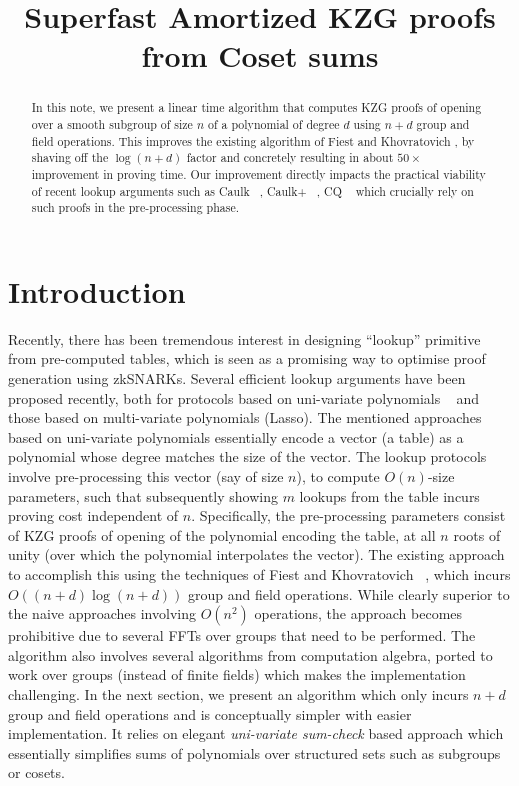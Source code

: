 \documentclass[11pt]{article}
\title{Superfast Amortized KZG proofs from Coset sums}
\begin{document}
    \maketitle
    \begin{abstract}
    In this note, we present a linear time algorithm that computes KZG proofs of opening over
        a smooth subgroup of size $n$ of a polynomial of degree $d$ using $n+d$ group and
        field operations. This improves the existing algorithm of Fiest and Khovratovich
        \cite{EPRINT:FeiKho23}, by shaving off the $\log(n+d)$ factor and concretely resulting
        in about $50\times$ improvement in proving time. Our improvement directly impacts the
        practical viability of recent lookup arguments such as Caulk ~\cite{CCS:ZBKMNS22},
        Caulk+ ~\cite{EPRINT:PosKat22}, CQ ~\cite{EPRINT:EagFioGab22} which crucially
        rely on such proofs in the pre-processing phase.
    \end{abstract}

    \section{Introduction}\label{sec:introduction}
    Recently, there has been tremendous interest in designing ``lookup'' primitive from pre-computed tables,
    which is seen as a promising way to optimise proof generation using zkSNARKs. Several efficient lookup
    arguments have been proposed recently, both for protocols based on uni-variate polynomials ~\cite{CCS:ZBKMNS22,
    EPRINT:PosKat22, EPRINT:EagFioGab22,EPRINT:ZGKMR22} and those based on multi-variate polynomials (Lasso).
    The mentioned approaches based on uni-variate polynomials essentially encode a vector (a table) as a
    polynomial whose degree matches the size of the vector. The lookup protocols involve pre-processing this
    vector (say of size $n$), to compute $O(n)$-size parameters, such that subsequently showing $m$ lookups
    from the table incurs proving cost independent of $n$. Specifically, the pre-processing parameters consist
    of KZG proofs of opening of the polynomial encoding the table, at all $n$ roots of unity (over which the polynomial
    interpolates the vector). The existing approach to accomplish this using the techniques of Fiest and Khovratovich
    ~\cite{EPRINT:FeiKho23}, which incurs $O((n+d)\log (n+d))$ group and field operations. While clearly superior
    to the naive approaches involving $O(n^2)$ operations, the approach becomes prohibitive due to several FFTs
    over groups that need to be performed. The algorithm also involves several algorithms from computation algebra,
    ported to work over groups (instead of finite fields) which makes the implementation challenging. In the next
    section, we present an algorithm which only incurs $n+d$ group and field operations and is conceptually simpler
    with easier implementation. It relies on elegant {\em uni-variate sum-check} based approach which essentially
    simplifies sums of polynomials over structured sets such as subgroups or cosets.
\end{document}
